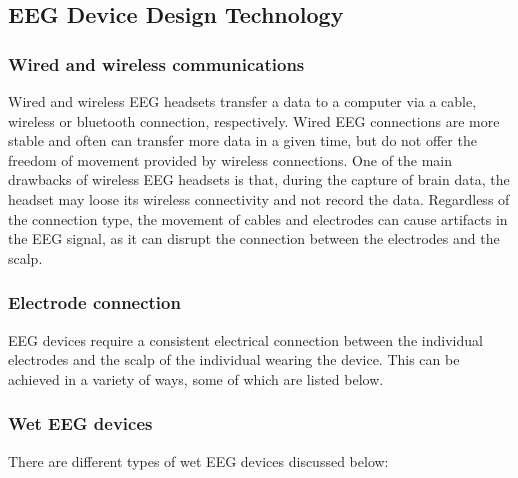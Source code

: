\documentclass[12pt,a4paper]{article}
\begin{document}
\subsection{EEG Device Design Technology}

\subsubsection{Wired and wireless communications}

{\large Wired and wireless EEG headsets transfer a data to a computer via a cable, wireless or bluetooth connection, respectively. Wired EEG connections are more stable and often can transfer more data in a given time, but do not offer the freedom of movement provided by wireless connections. One of the main drawbacks of wireless EEG headsets is that, during the capture of brain data, the headset may loose its wireless connectivity and not record the data. Regardless of the connection type, the movement of cables and electrodes can cause artifacts in the EEG signal, as it can disrupt the connection between the electrodes and the scalp.}


\subsubsection{Electrode connection}


{\large EEG devices require a consistent electrical connection between the individual electrodes and the scalp of the individual wearing the device. This can be achieved in a variety of ways, some of which are listed below.}


\subsubsection{Wet EEG devices}

{\large There are different types of wet EEG devices discussed below:}
\end{document}
